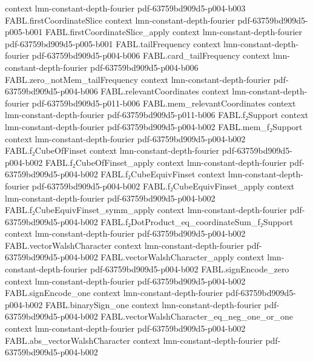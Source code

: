 \begin{theorem}
  {context}
  {lmn-constant-depth-fourier}
  {pdf-63759bd909d5-p004-b003}
\proofstep
  {FABL.firstCoordinateSlice}
  {context}
  {lmn-constant-depth-fourier}
  {pdf-63759bd909d5-p005-b001}
\proofstep
  {FABL.firstCoordinateSlice_apply}
  {context}
  {lmn-constant-depth-fourier}
  {pdf-63759bd909d5-p005-b001}
\proofstep
  {FABL.tailFrequency}
  {context}
  {lmn-constant-depth-fourier}
  {pdf-63759bd909d5-p004-b006}
\proofstep
  {FABL.card_tailFrequency}
  {context}
  {lmn-constant-depth-fourier}
  {pdf-63759bd909d5-p004-b006}
\proofstep
  {FABL.zero_notMem_tailFrequency}
  {context}
  {lmn-constant-depth-fourier}
  {pdf-63759bd909d5-p004-b006}
\proofstep
  {FABL.relevantCoordinates}
  {context}
  {lmn-constant-depth-fourier}
  {pdf-63759bd909d5-p011-b006}
\proofstep
  {FABL.mem_relevantCoordinates}
  {context}
  {lmn-constant-depth-fourier}
  {pdf-63759bd909d5-p011-b006}
\proofstep
  {FABL.f₂Support}
  {context}
  {lmn-constant-depth-fourier}
  {pdf-63759bd909d5-p004-b002}
\proofstep
  {FABL.mem_f₂Support}
  {context}
  {lmn-constant-depth-fourier}
  {pdf-63759bd909d5-p004-b002}
\proofstep
  {FABL.f₂CubeOfFinset}
  {context}
  {lmn-constant-depth-fourier}
  {pdf-63759bd909d5-p004-b002}
\proofstep
  {FABL.f₂CubeOfFinset_apply}
  {context}
  {lmn-constant-depth-fourier}
  {pdf-63759bd909d5-p004-b002}
\proofstep
  {FABL.f₂CubeEquivFinset}
  {context}
  {lmn-constant-depth-fourier}
  {pdf-63759bd909d5-p004-b002}
\proofstep
  {FABL.f₂CubeEquivFinset_apply}
  {context}
  {lmn-constant-depth-fourier}
  {pdf-63759bd909d5-p004-b002}
\proofstep
  {FABL.f₂CubeEquivFinset_symm_apply}
  {context}
  {lmn-constant-depth-fourier}
  {pdf-63759bd909d5-p004-b002}
\proofstep
  {FABL.f₂DotProduct_eq_coordinateSum_f₂Support}
  {context}
  {lmn-constant-depth-fourier}
  {pdf-63759bd909d5-p004-b002}
\proofstep
  {FABL.vectorWalshCharacter}
  {context}
  {lmn-constant-depth-fourier}
  {pdf-63759bd909d5-p004-b002}
\proofstep
  {FABL.vectorWalshCharacter_apply}
  {context}
  {lmn-constant-depth-fourier}
  {pdf-63759bd909d5-p004-b002}
\proofstep
  {FABL.signEncode_zero}
  {context}
  {lmn-constant-depth-fourier}
  {pdf-63759bd909d5-p004-b002}
\proofstep
  {FABL.signEncode_one}
  {context}
  {lmn-constant-depth-fourier}
  {pdf-63759bd909d5-p004-b002}
\proofstep
  {FABL.binarySign_one}
  {context}
  {lmn-constant-depth-fourier}
  {pdf-63759bd909d5-p004-b002}
\proofstep
  {FABL.vectorWalshCharacter_eq_neg_one_or_one}
  {context}
  {lmn-constant-depth-fourier}
  {pdf-63759bd909d5-p004-b002}
\proofstep
  {FABL.abs_vectorWalshCharacter}
  {context}
  {lmn-constant-depth-fourier}
  {pdf-63759bd909d5-p004-b002}

\end{theorem}

